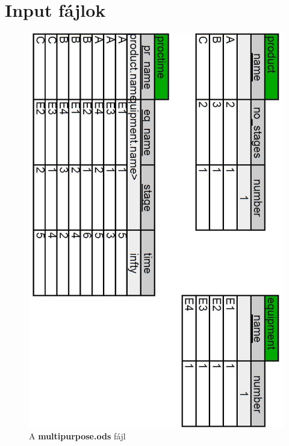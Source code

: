 \chapter{Input fájlok} \label{input_files}
\begin{figure}[H]
\begin{center}
\includegraphics[scale=0.4]{multipurposeOds}
\caption{A \textbf{multipurpose.ods} fájl}
\label{multipurpose_ods}
\end{center}
\end{figure}
